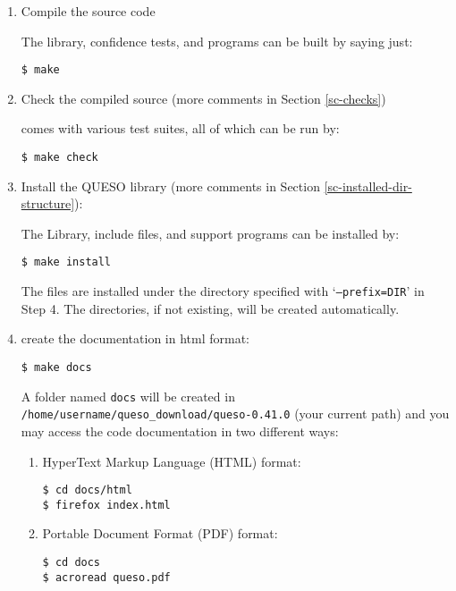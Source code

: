 \begin{enumerate}
{Note: the directory `\Verb+/home/username/Installations/queso_0_41_0_gnu+' does not need to exist in advance, since it will be created in step 7.
}

\item {Compile the \Queso{} source code %

The library, confidence tests, and programs can be built by saying just:
\begin{verbatim}
$ make
\end{verbatim}
}

\item {Check the compiled source (more comments in Section \ref{sc-checks})%

\Queso{} comes with various test suites, all of which can be run by:
\begin{verbatim}
$ make check
\end{verbatim}
}

\item {Install the QUESO library (more comments in Section \ref{sc-installed-dir-structure}): %

The \Queso{} Library, include files, and support programs can be installed by: %
\begin{verbatim}
$ make install 
\end{verbatim}}

The files are installed under the directory specified with `\texttt{--prefix=DIR}' in Step 4. The directories, if not existing, will be
        created automatically.%

\item {create the documentation in html format: %
\begin{verbatim}
$ make docs
\end{verbatim}

A folder named \Verb+docs+ will be created in \Verb+/home/username/queso_download/queso-0.41.0+ (your current path) and you may access the code documentation in two different ways:
\begin{enumerate}
\item HyperText Markup Language (HTML)  format:
\begin{verbatim}
$ cd docs/html
$ firefox index.html
\end{verbatim}

\item Portable Document Format (PDF) format:
\begin{verbatim}
$ cd docs
$ acroread queso.pdf
\end{verbatim}

\end{enumerate}


}
\end{enumerate}

